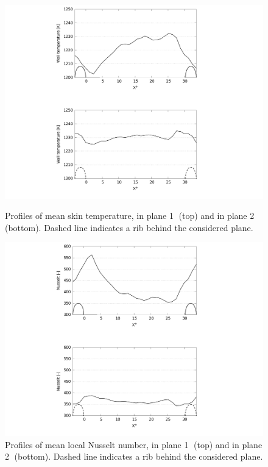\begin{figure}[h!]
\begin{minipage}[c]{1.0\linewidth}
\centering
\includegraphics[width=0.96\linewidth]{fig/applications/optim/Twall_curves.pdf}
\caption{Profiles of mean skin temperature, in plane \textcircled{1} (top) and in plane \textcircled{2} (bottom). Dashed line indicates a rib behind the considered plane.}
\label{Twall_curves}
\end{minipage}

\begin{minipage}[c]{1.0\linewidth}
\centering
\includegraphics[width=0.96\linewidth]{fig/applications/optim/Nusselt.pdf}
\caption{Profiles of mean local Nusselt number, in plane \textcircled{1} (top) and in plane \textcircled{2} (bottom). Dashed line indicates a rib behind the considered plane.}
\label{Nusselt}
\end{minipage}
\end{figure}

